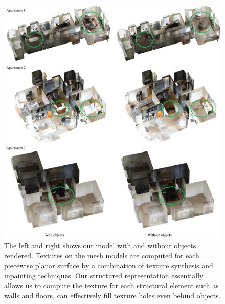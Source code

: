 \clearpage
\begin{figure}
 \begin{center}
  \includegraphics[width=\textwidth]{../figures/show_texture.png}
 \end{center}
 \caption{The left and right shows our model with and without objects
 rendered.  Textures on the mesh models are computed for each piecewise
 planar surface by a combination of texture synthesis and inpainting
 techniques. Our structured representation essentially allows us to
 compute the texture for each structural element such as walls and
 floors, can effectively fill texture holes even behind objects.}
 \label{fig:texture0}
\end{figure}

